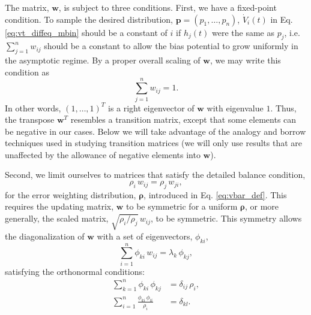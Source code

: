 \documentclass[reprint, superscriptaddress, floatfix]{revtex4-1}
\begin{document}
The matrix, $\mathbf w$, is subject to three conditions.
%
First, we have a fixed-point condition\cite{bussi2006, dama2014}.
%
To sample the desired distribution,
$\mathbf p = (p_1, \dots, p_n)$,
${\dot V}_i(t)$
in Eq. \eqref{eq:vt_diffeq_mbin}
should be a constant of $i$
if $h_j(t)$ were the same as $p_j$,
i.e.
$\sum_{j=1}^n w_{ij}$ should be a constant
to allow the bias potential to grow uniformly
in the asymptotic regime.
%
By a proper overall scaling of $\mathbf w$,
we may write this condition as
%
\begin{equation}
  \sum_{j = 1}^n w_{ij} = 1
  .
\label{eq:w_sumj}
\end{equation}
%
In other words, $(1, \dots, 1)^T$
is a right eigenvector of $\mathbf w$
with eigenvalue $1$.
%
Thus, the transpose $\mathbf w^T$
resembles a transition matrix,
except that some elements can be negative
in our cases.
%
Below we will take advantage of the analogy
and borrow techniques used
in studying transition matrices\cite{vankampen}
(we will only use results that are unaffected by the allowance
of negative elements into $\mathbf w$).


Second, we limit ourselves to matrices %
that satisfy
the detailed balance condition,
%
\begin{equation}
  \rho_i \, w_{ij} = \rho_j \, w_{ji}
  ,
  \label{eq:w_detailedbalance}
\end{equation}
%
for the error weighting distribution, $\pmb \rho$,
introduced in Eq. \eqref{eq:vbar_def}.
%
This requires the updating matrix, $\mathbf w$
to be symmetric
for a uniform $\pmb\rho$,
or more generally,
the scaled matrix, $\sqrt{ \rho_i/\rho_j } \, w_{ij}$,
to be symmetric.
%
This symmetry allows the diagonalization
of $\mathbf w$ with a set of
eigenvectors, $\phi_{ki}$,
%
\begin{equation}
  \sum_{i = 1}^n \phi_{ki} \, w_{ij}
  =
  \lambda_k \, \phi_{kj}
  ,
\label{eq:eig_w}
\end{equation}
%
satisfying the orthonormal conditions\cite{vankampen}:
%
\begin{align}
  \sum_{k = 1}^n
    \phi_{ki} \, \phi_{kj}
  &=
  \delta_{ij} \, \rho_i,
  \label{eq:eig_orthonormal_cols}
  \\
  \sum_{i = 1}^n
    \frac{ \phi_{ki} \, \phi_{li} }
         { \rho_i }
  &=
  \delta_{kl}
  .
  \label{eq:eig_orthonormal_rows}
\end{align}
\end{document}
